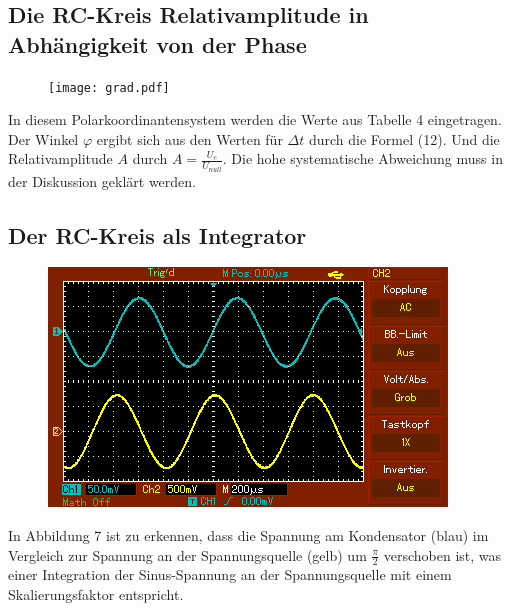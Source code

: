 	 \subsection{Die RC-Kreis Relativamplitude in Abhängigkeit von der Phase}

	 \begin{figure}[H]
	  \centering
	  \caption{}
	  \texttt{[image: grad.pdf]}
	  \label{fig:grad}
	 \end{figure}
	 
	 In diesem Polarkoordinantensystem werden die Werte aus Tabelle 4 eingetragen. Der Winkel $\varphi$ ergibt sich aus den Werten für $\Delta t$ durch die Formel (12). Und die Relativamplitude $A$ durch $A=\frac{U_c}{U_{null}}$. Die hohe systematische Abweichung muss in der Diskussion geklärt werden.
	 
	 
	 
	 \subsection{Der RC-Kreis als Integrator}
	 \begin{figure}[H]
	 	\centering
	 	\caption{}
	 	\includegraphics[width=\linewidth-70pt,height=\textheight-70pt,keepaspectratio]{content/MAP002.png}
	 	\label{fig:Sinus}
	 \end{figure}
	 In Abbildung 7 ist zu erkennen, dass die Spannung am Kondensator (blau) im Vergleich zur Spannung an der Spannungsquelle (gelb) um $\frac{\pi}{2}$ verschoben ist, was einer Integration der Sinus-Spannung an der Spannungsquelle mit einem Skalierungsfaktor entspricht. 
	 

